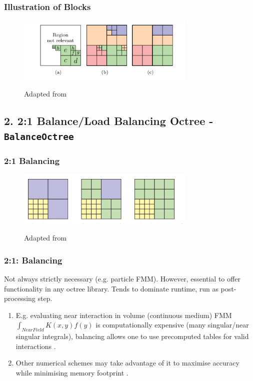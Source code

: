 \begin{frame}
    \frametitle{Illustration of Blocks}
    \begin{figure}
        \centering
        \includegraphics[width=8.5cm]{assets/blocks.png}
        \label{fig:anchor}
        \caption{Adapted from \cite{Sundar2007}}
    \end{figure}
\end{frame}

\cprotect\subsection{2. 2:1 Balance/Load Balancing Octree - \verb|BalanceOctree|}

\begin{frame}
    \frametitle{2:1 Balancing}
    \begin{figure}
        \centering
        \includegraphics[width=8.5cm]{assets/balance.png}
        \label{fig:balancing}
        \caption{Adapted from \cite{Suh2020}}
    \end{figure}
\end{frame}

\begin{frame}
    \frametitle{2:1: Balancing}
    Not always strictly necessary (e.g. particle FMM). However, essential to offer functionality in any octree library. Tends to dominate runtime, run as post-processing step.
    \begin{enumerate}
        \item E.g. evaluating near interaction in volume (continuous medium) FMM $\int_{Near Field} K(x,y) f(y)$ is computationally expensive (many singular/near singular integrals), balancing allows one to use precomputed tables for valid interactions \cite{Malhotra2016}.
        \item Other numerical schemes may take advantage of it to maximise accuracy while minimising memory footprint \cite{Suh2020}.
    \end{enumerate}
\end{frame}

